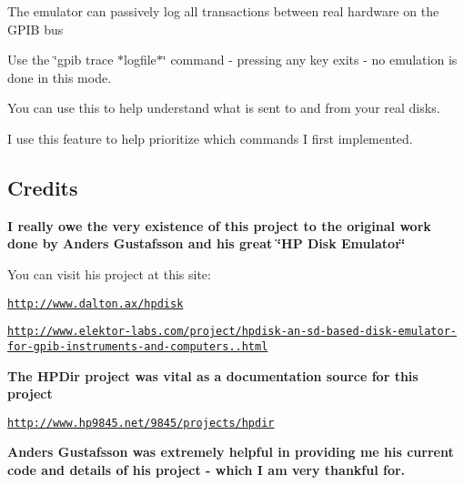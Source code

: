 \begin{DoxyItemize}
\begin{DoxyItemize}
\begin{DoxyItemize}
\begin{DoxyItemize}
\end{DoxyItemize}
\item The emulator can passively log all transactions between real hardware on the G\+P\+IB bus
\begin{DoxyItemize}
\item Use the \char`\"{}gpib trace $\ast$logfile$\ast$\char`\"{} command -\/ pressing any key exits -\/ no emulation is done in this mode.
\item You can use this to help understand what is sent to and from your real disks.
\item I use this feature to help prioritize which commands I first implemented. 


\end{DoxyItemize}
\end{DoxyItemize}
\end{DoxyItemize}
\end{DoxyItemize}

\subsection*{Credits}

{\bfseries I really owe the very existence of this project to the original work done by Anders Gustafsson and his great \char`\"{}\+H\+P Disk Emulator\char`\"{} }
\begin{DoxyItemize}
\item You can visit his project at this site\+:
\begin{DoxyItemize}
\item \href{http://www.dalton.ax/hpdisk}{\tt http\+://www.\+dalton.\+ax/hpdisk}
\item \href{http://www.elektor-labs.com/project/hpdisk-an-sd-based-disk-emulator-for-gpib-instruments-and-computers.13693.html}{\tt http\+://www.\+elektor-\/labs.\+com/project/hpdisk-\/an-\/sd-\/based-\/disk-\/emulator-\/for-\/gpib-\/instruments-\/and-\/computers..\+html}
\end{DoxyItemize}
\end{DoxyItemize}

{\bfseries  The H\+P\+Dir project was vital as a documentation source for this project}
\begin{DoxyItemize}
\item \href{http://www.hp9845.net/9845/projects/hpdir}{\tt http\+://www.\+hp9845.\+net/9845/projects/hpdir}
\end{DoxyItemize}

{\bfseries Anders Gustafsson was extremely helpful in providing me his current code and details of his project -\/ which I am very thankful for.}

